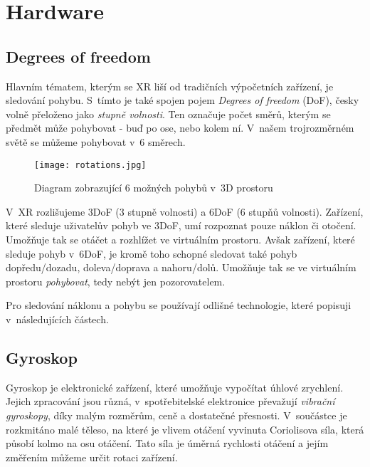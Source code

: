 \chapter{Hardware}

\section{Degrees of freedom}

Hlavním tématem, kterým se XR liší od tradičních výpočetních zařízení, je sledování pohybu. S~tímto je také spojen pojem \textit{Degrees of freedom} (DoF), česky volně přeloženo jako \textit{stupně volnosti}. Ten označuje počet směrů, kterým se předmět může pohybovat - buď po ose, nebo kolem ní. V~našem trojrozměrném světě se můžeme pohybovat v~6 směrech. \cite{mechatech_3dof_6dof}

\begin{figure}[H]
    \centering
    \texttt{[image: rotations.jpg]}
    \caption{Diagram zobrazující 6 možných pohybů v~3D prostoru \cite{nasa_aircraft}}
    \label{rotations_nasa_fig}
\end{figure}

V~XR rozlišujeme 3DoF (3 stupně volnosti) a 6DoF (6 stupňů volnosti). Zařízení, které sleduje uživatelův pohyb ve 3DoF, umí rozpoznat pouze náklon či otočení. Umožňuje tak se otáčet a rozhlížet ve virtuálním prostoru. Avšak zařízení, které sleduje pohyb v~6DoF, je kromě toho schopné sledovat také pohyb dopředu/dozadu, doleva/doprava a nahoru/dolů. Umožňuje tak se ve virtuálním prostoru \textit{pohybovat}, tedy nebýt jen pozorovatelem. \cite{mechatech_3dof_6dof}

Pro sledování náklonu a pohybu se používají odlišné technologie, které popisuji v~následujících částech.

\section{Gyroskop}

Gyroskop je elektronické zařízení, které umožňuje vypočítat úhlové zrychlení. Jejich zpracování jsou různá, v~spotřebitelské elektronice převažují \textit{vibrační gyroskopy}, díky malým rozměrům, ceně a dostatečné přesnosti. V~součástce je rozkmitáno malé těleso, na které je vlivem otáčení vyvinuta Coriolisova síla, která působí kolmo na osu otáčení. Tato síla je úměrná rychlosti otáčení a jejím změřením můžeme určit rotaci zařízení. \cite{Electricity_Magnetism} \cite{techmania_coriolis}


